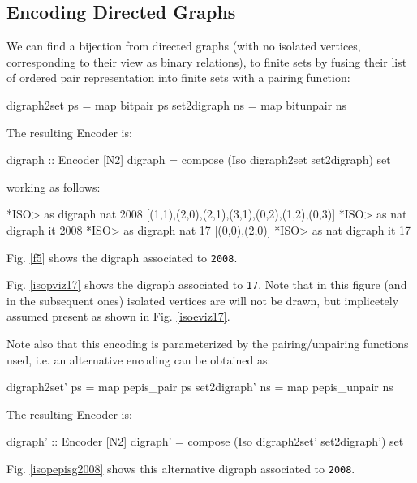 \documentclass[]{INCLUDES/llncs}
\begin{document}
\subsection{Encoding Directed Graphs} \label{digraphs}
We can find a bijection from 
directed graphs (with no isolated vertices, corresponding to their
 view as binary relations), to finite sets by fusing their list
 of ordered pair representation into finite sets with a pairing
 function:
\begin{code}
digraph2set ps = map bitpair ps
set2digraph ns = map bitunpair ns
\end{code}
The resulting Encoder is:
\begin{code}
digraph :: Encoder [N2]
digraph = compose (Iso digraph2set set2digraph) set
\end{code}
working as follows:
\begin{codex}
*ISO> as digraph nat 2008
[(1,1),(2,0),(2,1),(3,1),(0,2),(1,2),(0,3)]
*ISO> as nat digraph it
2008
*ISO> as digraph nat 17
[(0,0),(2,0)]
*ISO> as nat digraph it
17
\end{codex}
Fig. \ref{f5} shows the digraph associated to {\tt 2008}.

Fig. \ref{isopviz17} shows the digraph associated to {\tt 17}.
Note that in this figure (and in the subsequent ones) isolated vertices are
will not be drawn, but implicetely assumed present as shown in Fig.
\ref{isoeviz17}.

Note also that this encoding is parameterized by the pairing/unpairing functions
used, i.e. an alternative encoding can be obtained as:
\begin{code}
digraph2set' ps = map pepis_pair ps
set2digraph' ns = map pepis_unpair ns
\end{code}
The resulting Encoder is:
\begin{code}
digraph' :: Encoder [N2]
digraph' = compose (Iso digraph2set' set2digraph') set
\end{code}
Fig. \ref{isopepisg2008} shows this alternative digraph associated to {\tt 2008}.
\end{document}
